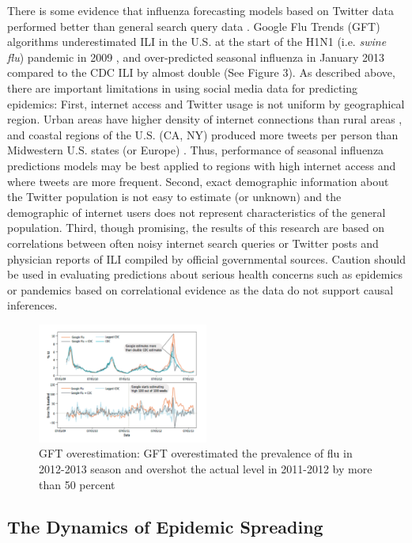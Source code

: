 \documentclass[sigconf]{acmart}
\begin{document}
There is some evidence that influenza forecasting models based on Twitter data performed 
better than general search query data \cite{paul14}. Google Flu Trends (GFT) algorithms 
underestimated ILI in the U.S. at the start of the H1N1 (i.e. {\it swine flu}) pandemic 
in 2009 \cite{butler13}, and over-predicted seasonal influenza in January 2013 compared 
to the CDC ILI by almost double \cite{lazer14} (See Figure 3). As described above, there 
are important limitations in using social media data for predicting epidemics: First, 
internet access and Twitter usage is not uniform by geographical region. Urban areas have 
higher density of internet connections than rural areas \cite{yuan13}, and coastal regions 
of the U.S. (CA, NY) produced more tweets per person than Midwestern U.S. states (or Europe) 
\cite{achrekar12}. Thus, performance of seasonal influenza predictions models may be best 
applied to regions with high internet access and where tweets are more frequent. Second, 
exact demographic information about the Twitter population is not easy to estimate (or 
unknown) and the demographic of internet users does not represent characteristics of the 
general population.  Third, though promising, the results of this research are based on 
correlations between often noisy internet search queries or Twitter posts and 
physician reports of ILI compiled by official governmental sources. Caution should be  
used in evaluating predictions about serious health concerns such as epidemics or 
pandemics based on correlational evidence as the data do not support causal inferences. 

\begin{figure}
  \centering
  \includegraphics[width=0.5\textwidth]{images/Figure3.pdf}
  \caption{GFT overestimation: GFT overestimated the prevalence of flu in 2012-2013 season
  and overshot the actual level in 2011-2012 by more than 50 percent \cite{lazer14}} 
  \label{fig:Figure3} 
\end{figure}

\subsection{The Dynamics of Epidemic Spreading} 
\end{document}
